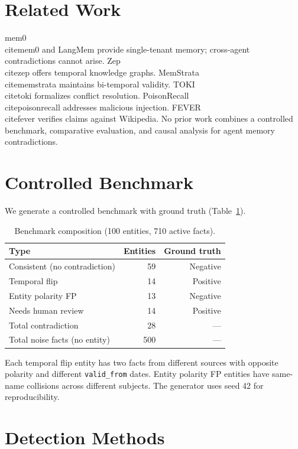 \documentclass{article}
\begin{document}
\section{Related Work}
mem0~\\cite{mem0} and LangMem provide single-tenant memory; cross-agent contradictions cannot arise. Zep~\\cite{zep} offers temporal knowledge graphs. MemStrata~\\cite{memstrata} maintains bi-temporal validity. TOKI~\\cite{toki} formalizes conflict resolution. PoisonRecall~\\cite{poisonrecall} addresses malicious injection. FEVER~\\cite{fever} verifies claims against Wikipedia. No prior work combines a controlled benchmark, comparative evaluation, and causal analysis for agent memory contradictions.

\section{Controlled Benchmark}
\label{sec:benchmark}


We generate a controlled benchmark with ground truth (Table~\ref{tab:benchmark}).

\begin{table}[h]
\centering
\caption{Benchmark composition (100 entities, 710 active facts).}
\begin{tabular}{lrr}
\toprule
Type & Entities & Ground truth \\
\midrule
Consistent (no contradiction) & 59 & Negative \\
Temporal flip & 14 & Positive \\
Entity polarity FP & 13 & Negative \\
Needs human review & 14 & Positive \\
\midrule
Total contradiction & 28 & --- \\
Total noise facts (no entity) & 500 & --- \\
\bottomrule
\end{tabular}
\label{tab:benchmark}
\end{table}

Each temporal flip entity has two facts from different sources with opposite polarity and different \texttt{valid\_from} dates. Entity polarity FP entities have same-name collisions across different subjects. The generator uses seed 42 for reproducibility.

\section{Detection Methods}
\label{sec:methods}
\end{document}
